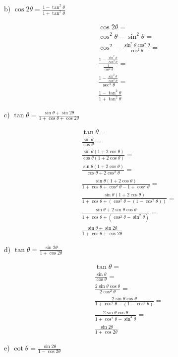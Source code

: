 \documentclass[]{report}
\begin{document}
b) $\cos2\theta  = \frac{1 - \tan^2\theta}{1 + \tan^2\theta}$

\begin{align*}
\cos2\theta = \\
\cos^2\theta - \sin^2\theta = \\
\cos^2 - \frac{\sin^2\theta\cos^2\theta}{\cos^2\theta} = \\
\frac{1 - \frac{\sin^2\theta}{\cos^2\theta}}{\frac{1}{\cos^2\theta}} = \\
\frac{1 - \frac{\sin^2\theta}{\cos^2\theta}}{\sec^2\theta} = \\
\frac{1 - \tan^2\theta}{1 + \tan^2\theta}
\end{align*}

c) $\tan\theta = \frac{\sin\theta + \sin2\theta}{1 + \cos\theta+\cos2\theta}$

\begin{align*}
\tan\theta = \\
\frac{\sin\theta}{\cos\theta} = \\
\frac{\sin\theta(1 + 2\cos\theta)}{\cos\theta(1 +2\cos\theta)} = \\
\frac{\sin\theta(1 + 2\cos\theta)}{\cos\theta+2\cos^2\theta} = \\
\frac{\sin\theta(1 + 2\cos\theta)}{1 + \cos\theta+\cos^2\theta - 1 + \cos^2\theta} = \\
\frac{\sin\theta(1 + 2\cos\theta)}{1 + \cos\theta+(\cos^2\theta - (1 - \cos^2\theta))} = \\
\frac{\sin\theta + 2\sin\theta\cos\theta}{1 + \cos\theta+(\cos^2\theta - \sin^2\theta)} = \\
\frac{\sin\theta + \sin2\theta}{1 + \cos\theta+\cos2\theta}
\end{align*}

d) $\tan \theta = \frac{\sin2\theta}{1 + \cos2\theta}$

\begin{align*}
\tan \theta =  \\ 
\frac{\sin\theta}{\cos\theta} = \\
\frac{2\sin\theta\cos\theta}{2\cos^2\theta}=\\
\frac{2\sin\theta\cos\theta}{1 + \cos^2\theta - (1-\cos^2\theta)}=\\
\frac{2\sin\theta\cos\theta}{1 + \cos^2\theta - \sin^2\theta}=\\
 \frac{\sin2\theta}{1 + \cos2\theta}
\end{align*}

e) $\cot \theta =\frac{\sin2\theta}{1 - \cos2\theta}$
\end{document}
